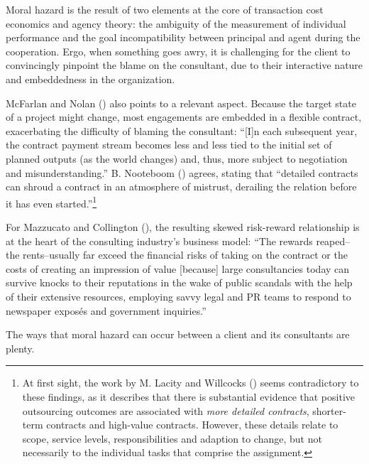 \documentclass[
  man,floatsintext]{apa6}
\begin{document}
Moral hazard is the result of two elements at the core of transaction cost economics and agency theory: the ambiguity of the measurement of individual performance and the goal incompatibility between principal and agent during the cooperation. Ergo, when something goes awry, it is challenging for the client to convincingly pinpoint the blame on the consultant, due to their interactive nature and embeddedness in the organization.

McFarlan and Nolan () also points to a relevant aspect. Because the target state of a project might change, most engagements are embedded in a flexible contract, exacerbating the difficulty of blaming the consultant: ``{[}I{]}n each subsequent year, the contract payment stream becomes less and less tied to the initial set of planned outputs (as the world changes) and, thus, more subject to negotiation and misunderstanding.'' B. Nooteboom () agrees, stating that ``detailed contracts can shroud a contract in an atmosphere of mistrust, derailing the relation before it has even started.''\footnote{At first sight, the work by M. Lacity and Willcocks () seems contradictory to these findings, as it describes that there is substantial evidence that positive outsourcing outcomes are associated with \emph{more detailed contracts}, shorter-term contracts and high-value contracts. However, these details relate to scope, service levels, responsibilities and adaption to change, but not necessarily to the individual tasks that comprise the assignment.}

For Mazzucato and Collington (), the resulting skewed risk-reward relationship is at the heart of the consulting industry's business model: ``The rewards reaped--the rents--usually far exceed the financial risks of taking on the contract or the costs of creating an impression of value {[}because{]} large consultancies today can survive knocks to their reputations in the wake of public scandals with the help of their extensive resources, employing savvy legal and PR teams to respond to newspaper exposés and government inquiries.''

The ways that moral hazard can occur between a client and its consultants are plenty.
\end{document}
